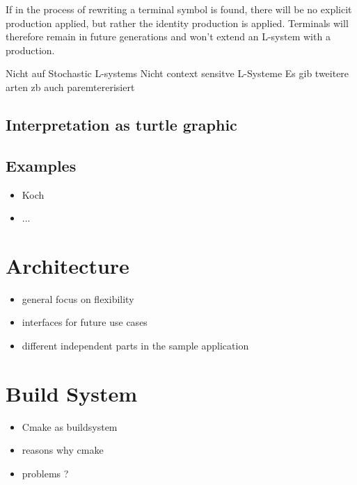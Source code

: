 \documentclass[english]{cpp-hmwk}
\begin{document}
\bigskip

If in the process of rewriting a terminal symbol is found, there will be no explicit production applied, but rather the identity production is applied. Terminals will therefore remain in future generations and won't extend an L-system with a production.

\bigskip






Nicht auf Stochastic L-systems
Nicht context sensitve L-Systeme
Es gib tweitere arten zb auch paremtererisiert

\subsection{Interpretation as turtle graphic}

\subsection{Examples}

\begin{itemize}
	\item Koch
	\item ...
\end{itemize}
  
  


  
\pagebreak
\section{Architecture}
\begin{itemize}
	\item general focus on flexibility
	\item interfaces for future use cases
	\item different independent parts in the sample application
\end{itemize}

\section{Build System}
\begin{itemize}
	\item Cmake as buildsystem
	\item reasons why cmake
	\item problems ?
\end{itemize}
\end{document}
